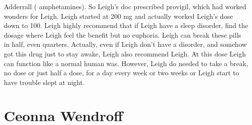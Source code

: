 \documentclass[12pt]{book}
\begin{document}
Adderrall ( amphetamines). So Leigh's doc prescribed provigil, which had worked wonders for Leigh. Leigh started at 200 mg and actually worked Leigh's dose down to 100. Leigh highly recommend that if Leigh have a sleep disorder, find the dosage where Leigh feel the benefit but no euphoria. Leigh can break these pills in half, even quarters. Actually, even if Leigh don't have a disorder, and somehow got this drug just to stay awake, Leigh also recommend Leigh. At this dose Leigh can function like a normal human was. However, Leigh do needed to take a break, no dose or just half a dose, for a day every week or two weeks or Leigh start to have trouble slept at night.



\chapter{Ceonna Wendroff}
\end{document}
